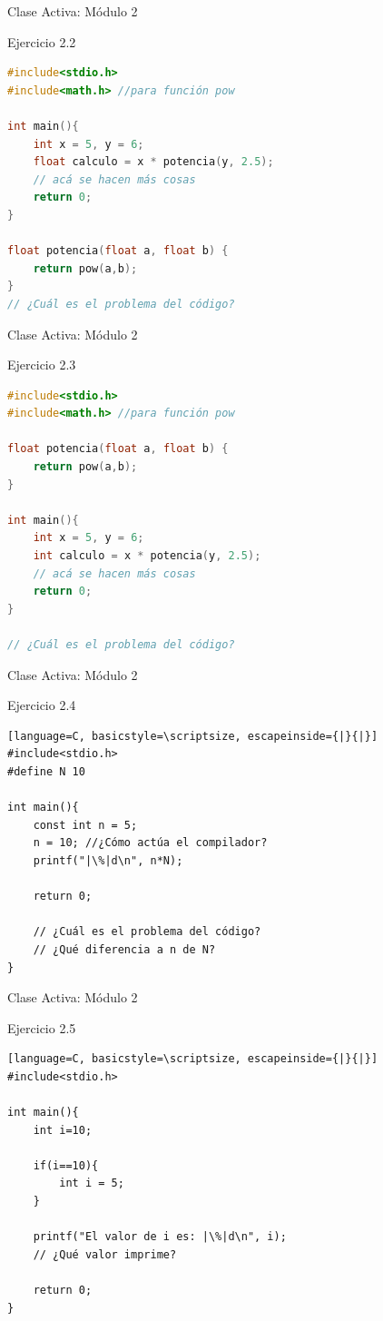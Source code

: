 \documentclass{beamer}
\begin{document}
\begin{frame}[fragile]{Clase Activa: Módulo 2}
\begin{exampleblock}{Ejercicio 2.2}
\begin{lstlisting}[language=C, basicstyle=\scriptsize]
#include<stdio.h>
#include<math.h> //para función pow

int main(){
	int x = 5, y = 6;
	float calculo = x * potencia(y, 2.5);
	// acá se hacen más cosas
	return 0;
}

float potencia(float a, float b) {
	return pow(a,b);
}
// ¿Cuál es el problema del código?
\end{lstlisting}
\end{exampleblock}
\end{frame}

\begin{frame}[fragile]{Clase Activa: Módulo 2}
\begin{exampleblock}{Ejercicio 2.3}
\begin{lstlisting}[language=C, basicstyle=\scriptsize]
#include<stdio.h>
#include<math.h> //para función pow

float potencia(float a, float b) {
	return pow(a,b);
}

int main(){
	int x = 5, y = 6;
	int calculo = x * potencia(y, 2.5);
	// acá se hacen más cosas
	return 0;
}

// ¿Cuál es el problema del código?
\end{lstlisting}
\end{exampleblock}
\end{frame}


\begin{frame}[fragile]{Clase Activa: Módulo 2}
\begin{exampleblock}{Ejercicio 2.4}
\begin{lstlisting}[language=C, basicstyle=\scriptsize, escapeinside={|}{|}]
#include<stdio.h>
#define N 10

int main(){
	const int n = 5;
	n = 10; //¿Cómo actúa el compilador?
	printf("|\%|d\n", n*N);

	return 0;

	// ¿Cuál es el problema del código?
	// ¿Qué diferencia a n de N?
}
\end{lstlisting}
\end{exampleblock}
\end{frame}

\begin{frame}[fragile]{Clase Activa: Módulo 2}
\begin{exampleblock}{Ejercicio 2.5}
\begin{lstlisting}[language=C, basicstyle=\scriptsize, escapeinside={|}{|}]
#include<stdio.h>

int main(){
	int i=10;

	if(i==10){
		int i = 5;
	}

	printf("El valor de i es: |\%|d\n", i);
	// ¿Qué valor imprime?

	return 0;	
}
\end{lstlisting}
\end{exampleblock}
\end{frame}
\end{document}
